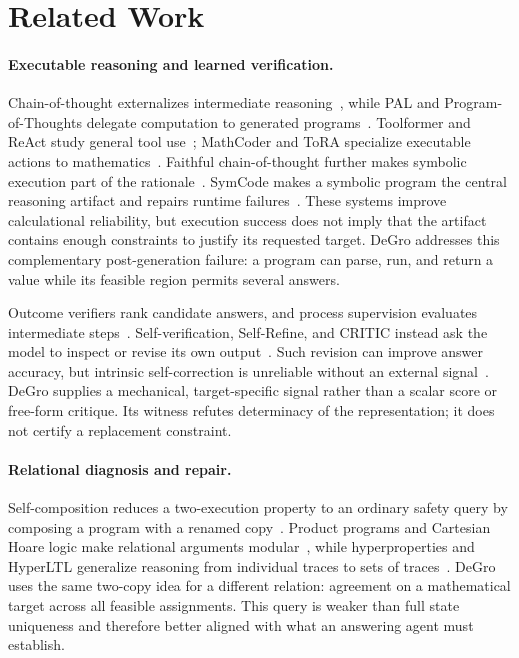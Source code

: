 \documentclass[sigconf,anonymous]{aamas}
\begin{document}
\section{Related Work}
\paragraph{Executable reasoning and learned verification.}
Chain-of-thought externalizes intermediate reasoning~\cite{wei2022cot}, while PAL and Program-of-Thoughts delegate computation to generated programs~\cite{gao2023pal,chen2023pot}.  Toolformer and ReAct study general tool use~\cite{schick2023toolformer,yao2023react}; MathCoder and ToRA specialize executable actions to mathematics~\cite{wang2024mathcoder,gou2024tora}.  Faithful chain-of-thought further makes symbolic execution part of the rationale~\cite{lyu2023faithful}.  SymCode makes a symbolic program the central reasoning artifact and repairs runtime failures~\cite{nezhad2026symcode}.  These systems improve calculational reliability, but execution success does not imply that the artifact contains enough constraints to justify its requested target.  DeGro addresses this complementary post-generation failure: a program can parse, run, and return a value while its feasible region permits several answers.

Outcome verifiers rank candidate answers, and process supervision evaluates intermediate steps~\cite{cobbe2021verifiers,uesato2022feedback,lightman2023verify}.  Self-verification, Self-Refine, and CRITIC instead ask the model to inspect or revise its own output~\cite{weng2023selfverification,madaan2023selfrefine,gou2024critic}.  Such revision can improve answer accuracy, but intrinsic self-correction is unreliable without an external signal~\cite{huang2024selfcorrect}.  DeGro supplies a mechanical, target-specific signal rather than a scalar score or free-form critique.  Its witness refutes determinacy of the representation; it does not certify a replacement constraint.

\paragraph{Relational diagnosis and repair.}
Self-composition reduces a two-execution property to an ordinary safety query by composing a program with a renamed copy~\cite{barthe2004selfcomposition,terauchi2005safety}.  Product programs and Cartesian Hoare logic make relational arguments modular~\cite{barthe2011product,sousa2016cartesian}, while hyperproperties and HyperLTL generalize reasoning from individual traces to sets of traces~\cite{clarkson2010hyperproperties,clarkson2014hyperltl,finkbeiner2015modelchecking}.  DeGro uses the same two-copy idea for a different relation: agreement on a mathematical target across all feasible assignments.  This query is weaker than full state uniqueness and therefore better aligned with what an answering agent must establish.
\end{document}
